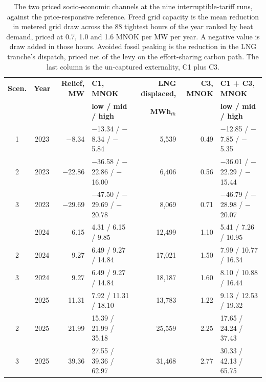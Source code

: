 \begin{table}[htbp]
\centering
\caption{The two priced socio-economic channels at the nine interruptible-tariff runs, against the price-responsive reference. Freed grid capacity is the mean reduction in metered grid draw across the 88 tightest hours of the year ranked by heat demand, priced at 0.7, 1.0 and 1.6 MNOK per MW per year. A negative value is draw added in those hours. Avoided fossil peaking is the reduction in the LNG tranche's dispatch, priced net of the levy on the effort-sharing carbon path. The last column is the un-captured externality, C1 plus C3.}
\small
\setlength{\tabcolsep}{5pt}
\begin{tabular}{c c r l r r l}
\toprule
\textbf{Scen.} & \textbf{Year} & \textbf{Relief, MW} & \textbf{C1, MNOK} & \textbf{LNG displaced,} & \textbf{C3, MNOK} & \textbf{C1 + C3, MNOK} \\
 & & & \textbf{low / mid / high} & \textbf{MWh$_{th}$} & & \textbf{low / mid / high} \\
\midrule
1 & 2023 & $-$8.34 & $-$13.34 / $-$8.34 / $-$5.84 & 5{,}539 & 0.49 & $-$12.85 / $-$7.85 / $-$5.35 \\
2 & 2023 & $-$22.86 & $-$36.58 / $-$22.86 / $-$16.00 & 6{,}406 & 0.56 & $-$36.01 / $-$22.29 / $-$15.44 \\
3 & 2023 & $-$29.69 & $-$47.50 / $-$29.69 / $-$20.78 & 8{,}069 & 0.71 & $-$46.79 / $-$28.98 / $-$20.07 \\
\addlinespace
1 & 2024 & 6.15 & 4.31 / 6.15 / 9.85 & 12{,}499 & 1.10 & 5.41 / 7.26 / 10.95 \\
2 & 2024 & 9.27 & 6.49 / 9.27 / 14.84 & 17{,}021 & 1.50 & 7.99 / 10.77 / 16.34 \\
3 & 2024 & 9.27 & 6.49 / 9.27 / 14.84 & 18{,}187 & 1.60 & 8.10 / 10.88 / 16.44 \\
\addlinespace
1 & 2025 & 11.31 & 7.92 / 11.31 / 18.10 & 13{,}783 & 1.22 & 9.13 / 12.53 / 19.32 \\
2 & 2025 & 21.99 & 15.39 / 21.99 / 35.18 & 25{,}559 & 2.25 & 17.65 / 24.24 / 37.43 \\
3 & 2025 & 39.36 & 27.55 / 39.36 / 62.97 & 31{,}468 & 2.77 & 30.33 / 42.13 / 65.75 \\
\bottomrule
\end{tabular}
\label{tab:4.3 channels}
\end{table}

